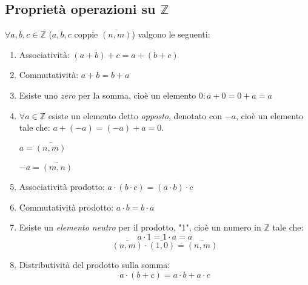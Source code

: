 \subsection{Proprietà operazioni su \(\mathbb{Z}\)} 
\(\forall a,b,c\in\mathbb{Z}\) (\(a,b,c\) coppie \(\overline{(n,m)}\)) valgono le seguenti:
\begin{enumerate}
    \item Associatività: \((a+b)+c=a+(b+c)\)
    \item Commutatività: \(a+b=b+a\)
    \item Esiste uno \textit{zero} per la somma, cioè un elemento \(0: a+0=0+a=a\)
    \item \(\forall a\in\mathbb{Z}\) esiste un elemento detto \textit{opposto}, denotato con \(-a\), cioè un elemento tale che: \(a+(-a)=(-a)+a=0\).
    
    \(a=\overline{(n,m)}\)
    
    \(-a=\overline{(m,n)}\)
    \item Associatività prodotto: \(a\cdot (b\cdot c)=(a\cdot b)\cdot c\)
    \item Commutatività prodotto: \(a\cdot b=b\cdot a\)
    \item Esiste un \textit{elemento neutro} per il prodotto, "1", cioè un numero in \(\mathbb{Z}\) tale che:
    \[a\cdot 1=1\cdot a=a\]
    \[\overline{(n,m)}\cdot\overline{(1,0)}=\overline{(n,m)}\]
    \item Distributività del prodotto sulla somma:
    \[a\cdot (b+c)=a\cdot b+a\cdot c\]
\end{enumerate}


